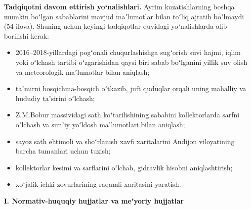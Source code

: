 \textbf{Tadqiqotni davom ettirish yoʻnalishlari.} Ayrim kuzatishlarning
boshqa mumkin boʻlgan sabablarini mavjud maʼlumotlar bilan toʻliq
ajratib boʻlmaydi (54-ilova). Shuning uchun keyingi tadqiqotlar quyidagi
yoʻnalishlarda olib borilishi kerak:

\begin{itemize}
\tightlist
\item
  2016--2018-yillardagi pogʻonali chuqurlashishga sugʻorish suvi hajmi,
  iqlim yoki oʻlchash tartibi oʻzgarishidan qaysi biri sabab boʻlganini
  yillik suv olish va meteorologik maʼlumotlar bilan aniqlash;
\item
  taʼmirni bosqichma-bosqich oʻtkazib, juft quduqlar orqali uning
  mahalliy va hududiy taʼsirini oʻlchash;
\item
  Z.M.Bobur massividagi sath koʻtarilishining sababini kollektorlarda
  sarfni oʻlchash va sunʼiy yoʻldosh maʼlumotlari bilan aniqlash;
\item
  sayoz sath ehtimoli va shoʻrlanish xavfi xaritalarini Andijon
  viloyatining barcha tumanlari uchun tuzish;
\item
  kollektorlar kesimi va sarflarini oʻlchab, gidravlik hisobni
  aniqlashtirish;
\item
  xoʻjalik ichki zovurlarining raqamli xaritasini yaratish.
\end{itemize}


\textbf{I. Normativ-huquqiy hujjatlar va meʼyoriy hujjatlar}

